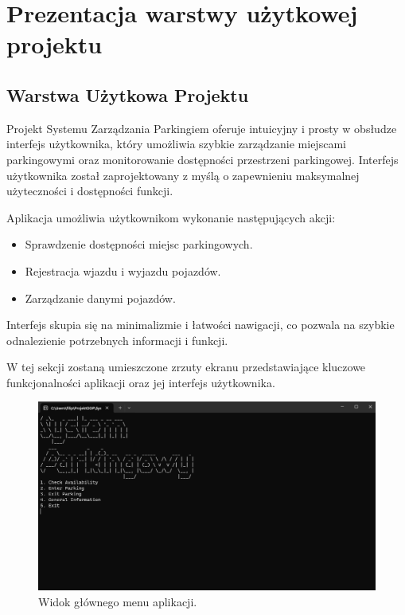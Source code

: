 \chapter{Prezentacja warstwy użytkowej projektu}

\section{Warstwa Użytkowa Projektu}

Projekt Systemu Zarządzania Parkingiem oferuje intuicyjny i prosty w obsłudze interfejs użytkownika, który umożliwia szybkie zarządzanie miejscami parkingowymi oraz monitorowanie dostępności przestrzeni parkingowej. Interfejs użytkownika został zaprojektowany z myślą o zapewnieniu maksymalnej użyteczności i dostępności funkcji.

Aplikacja umożliwia użytkownikom wykonanie następujących akcji:
\begin{itemize}
    \item Sprawdzenie dostępności miejsc parkingowych.
    \item Rejestracja wjazdu i wyjazdu pojazdów.
    \item Zarządzanie danymi pojazdów.
\end{itemize}

Interfejs skupia się na minimalizmie i łatwości nawigacji, co pozwala na szybkie odnalezienie potrzebnych informacji i funkcji.

W tej sekcji zostaną umieszczone zrzuty ekranu przedstawiające kluczowe funkcjonalności aplikacji oraz jej interfejs użytkownika.

\begin{figure}[H]
\centering
\includegraphics[width=\textwidth]{photos/mainmenu.png}
\caption{Widok głównego menu aplikacji.}
\end{figure}

